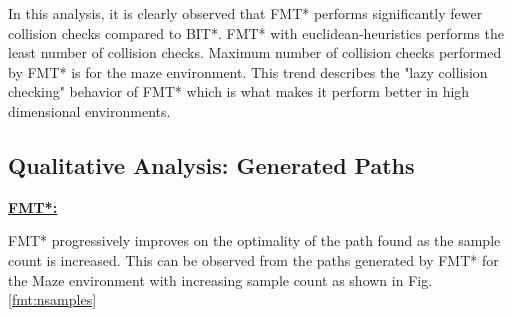 \documentclass{article}
\begin{document}
In this analysis, it is clearly observed that FMT* performs significantly fewer collision checks compared to BIT*. FMT* with euclidean-heuristics performs the least number of collision checks. Maximum number of collision checks performed by FMT* is for the maze environment. This trend describes the "lazy collision checking" behavior of FMT* which is what makes it perform better in high dimensional environments. 

\subsection{Qualitative Analysis: Generated Paths}

\textbf{\underline{FMT*:}}

FMT* progressively improves on the optimality of the path found as the sample count is increased. This can be observed from the paths generated by FMT* for the Maze environment with increasing sample count as shown in Fig. \ref{fmt:nsamples}
\end{document}
